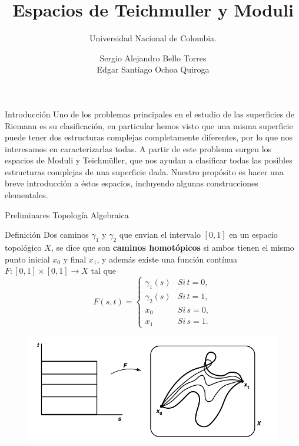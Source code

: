 \documentclass[xcolor=dvipsnames,10pt]{beamer}
\title[Universidad Nacional de Colombia]{Espacios de Teichmuller y Moduli}
\subtitle{Universidad  Nacional de Colombia.}
\author[Superficies de Riemann]{Sergio Alejandro Bello Torres\\
Edgar Santiago Ochoa Quiroga}
\date[\textcolor{white}{Julio/2025}]
\begin{document}
\maketitle
\begin{frame}{Introducción}
    Uno de los problemas principales en el estudio de las superficies de Riemann es su clasificación, en particular hemos visto que una misma superficie puede tener dos estructuras complejas completamente diferentes, por lo que nos interesamos en caracterizarlas todas. A partir de este problema surgen los espacios de Moduli y Teichmüller, que nos ayudan a clasificar todas las posibles estructuras complejas de una superficie dada. Nuestro propósito es hacer una breve introducción a éstos espacios, incluyendo algunas construcciones elementales.

\end{frame}
\begin{frame}{Preliminares Topología Algebraica}

    \begin{block}{Definición}
        Dos caminos $\gamma_1$ y $\gamma_2$ que envian el intervalo $[0,1]$ en un espacio topológico $X$, se dice que son \textbf{caminos homotópicos} si ambos tienen el mismo punto inicial $x_0$ y final $x_1$, y además existe una función contínua $F:[0,1]\times[0,1]\to X$ tal que
        $$F(s,t)=\begin{cases}
        \gamma_1(s) & Si\,t=0,\\
        \gamma_2(s) & Si\,t=1,\\
        x_0& Si\,s=0,\\
        x_1& Si\,s=1.
        \end{cases}$$
        \end{block}
        \begin{figure}
        \centering
        \includegraphics[width=0.5\linewidth]{Imagenes/imagen_2025-07-10_112455145.png}
    \end{figure}
\end{frame}
\end{document}
